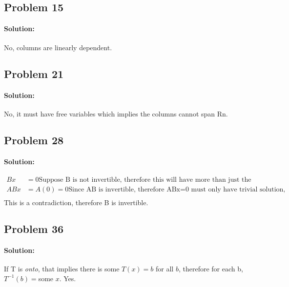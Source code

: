 \documentclass[11pt, notitlepage]{article}
\newenvironment{solution}{\paragraph{Solution:}}{\hfill}
\begin{document}
\subsection{Problem 15}
\begin{solution}
	No, columns are linearly dependent.
\end{solution}
\subsection{Problem 21}
\begin{solution}
	No, it must have free variables which implies the columns cannot span Rn.
\end{solution}
\subsection{Problem 28}
\begin{solution}
	\begin{align*}
		Bx&=0 \text{Suppose B is not invertible, therefore this will have more than just the trivial solution, suppose x is some nonzero solution}\\
		ABx&=A(0)=0 \text{Since AB is invertible, therefore ABx=0 must only have trivial solution, but x is a nonzero solution}\\
	\end{align*}
	This is a contradiction, therefore B is invertible.
\end{solution}
\subsection{Problem 36}
\begin{solution}
	If T is \textit{onto}, that implies there is some $T(x)=b$ for all $b$, therefore for each b, $T^{-1}(b)=$some $x$. Yes.
\end{solution}
\end{document}
